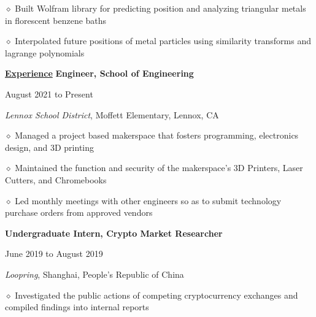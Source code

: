 \documentclass [11pt]{article}
\begin{document}
\begin{flushleft}
‭‭\quad\quad\quad$\diamond$ ‭Built Wolfram library for predicting position and analyzing triangular metals in florescent benzene baths

‭‭\quad\quad\quad$\diamond$ Interpolated future positions of metal particles using similarity transforms and lagrange polynomials
%
‭‭%
%
‭‭%

\vspace{7}
\underline{\textbf{Experience}}
\linebreak
\textbf{Engineer, School of Engineering}\begin{minipage}{0.7 \linewidth}\begin{flushright}August 2021 to Present\end{flushright}\end{minipage}
\emph{Lennox School District}, Moffett Elementary, Lennox, CA

‭‭\quad\quad\quad$\diamond$ Managed a project based makerspace that fosters programming, electronics design, and 3D printing

\quad\quad\quad$\diamond$ Maintained the function and security of the makerspace's 3D Printers, Laser Cutters, and Chromebooks

‭‭\quad\quad\quad$\diamond$ Led monthly meetings with other engineers so as to submit technology purchase orders from approved vendors

\linebreak
\textbf{Undergraduate Intern, Crypto Market Researcher}\begin{minipage}{0.55 \linewidth}\begin{flushright}June 2019 to August 2019\end{flushright}\end{minipage}
\emph{Loopring}, Shanghai, People's Republic of China

‭‭\quad\quad\quad$\diamond$ Investigated the public actions of competing cryptocurrency exchanges and compiled findings into internal reports


\end{flushleft}
\end{document}
